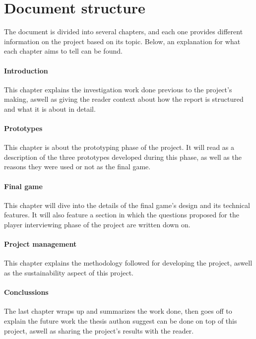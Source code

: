 
\section{Document structure}
The document is divided into several chapters, and each one provides different
information on the project based on its topic. Below, an explanation for what
each chapter aims to tell can be found.

\paragraph{Introduction}
This chapter explains the investigation work done previous to the project's
making, aswell as giving the reader context about how the report 
is structured and what it is about in detail.

\paragraph{Prototypes}
This chapter is about the prototyping phase of the project. It will read
as a description of the three prototypes developed during this phase,
as well as the reasons they were used or not as the final game.

\paragraph{Final game}
This chapter will dive into the details of the final game's design and
its technical features. It will also feature a section in which the
questions proposed for the player interviewing phase of the project
are written down on.

\paragraph{Project management}
This chapter explains the methodology followed for developing the project,
aswell as the sustainability aspect of this project.

\paragraph{Conclussions}
The last chapter wraps up and summarizes the work done, then goes off to
explain the future work the thesis authon suggest can be done on top of
this project, aswell as sharing the project's results with the reader.
